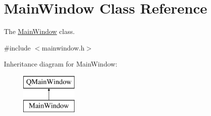 \hypertarget{classMainWindow}{\section{Main\-Window Class Reference}
\label{classMainWindow}
}


The \hyperlink{classMainWindow}{Main\-Window} class.  




{\ttfamily \#include $<$mainwindow.\-h$>$}

Inheritance diagram for Main\-Window\-:\begin{figure}[H]
\begin{center}
\leavevmode
\includegraphics[height=2.000000cm]{classMainWindow}
\end{center}
\end{figure}
